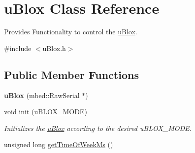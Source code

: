 \hypertarget{classu_blox}{}\section{u\+Blox Class Reference}
\label{classu_blox}


Provides Functionality to control the \hyperlink{classu_blox}{u\+Blox}.  




{\ttfamily \#include $<$u\+Blox.\+h$>$}

\subsection*{Public Member Functions}
\begin{DoxyCompactItemize}
\item 
\hypertarget{classu_blox_a81e94abeda6b79a8f8eb56599a4ed4b5}{}{\bfseries u\+Blox} (mbed\+::\+Raw\+Serial $\ast$)\label{classu_blox_a81e94abeda6b79a8f8eb56599a4ed4b5}

\item 
void \hyperlink{classu_blox_a5005d11f191751df7fb93f126e2e7fd7}{init} (\hyperlink{u_blox_config_8h_a6385c8c7bdf45fd188525597db9b7314}{u\+B\+L\+O\+X\+\_\+\+M\+O\+D\+E})
\begin{DoxyCompactList}\small\item\em Initializes the \hyperlink{classu_blox}{u\+Blox} according to the desired u\+B\+L\+O\+X\+\_\+\+M\+O\+D\+E. \end{DoxyCompactList}\item 
\hypertarget{classu_blox_ae728283170659a04c5af8676297750a7}{}unsigned long \hyperlink{classu_blox_ae728283170659a04c5af8676297750a7}{get\+Time\+Of\+Week\+Ms} ()\label{classu_blox_ae728283170659a04c5af8676297750a7}


\end{DoxyCompactItemize}
